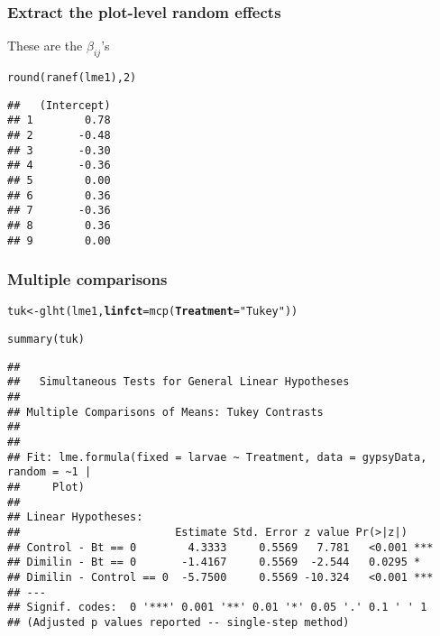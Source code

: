 \documentclass[color=usenames,dvipsnames]{beamer}\usepackage[]{graphicx}\usepackage[]{color}
\makeatletter
\newcommand{\hlnum}[1]{\textcolor[rgb]{0.69,0.494,0}{#1}}%
\newcommand{\hlstr}[1]{\textcolor[rgb]{0.749,0.012,0.012}{#1}}%
\newcommand{\hlstd}[1]{\textcolor[rgb]{0,0,0}{#1}}%
\newcommand{\hlkwb}[1]{\textcolor[rgb]{0,0.341,0.682}{#1}}%
\newcommand{\hlkwc}[1]{\textcolor[rgb]{0,0,0}{\textbf{#1}}}%
\newcommand{\hlkwd}[1]{\textcolor[rgb]{0.004,0.004,0.506}{#1}}%
\newenvironment{kframe}{%
 \def\at@end@of@kframe{}%
 \ifinner\ifhmode%
  \def\at@end@of@kframe{\end{minipage}}%
  \begin{minipage}{\columnwidth}%
 \fi\fi%
 \def\FrameCommand##1{\hskip\@totalleftmargin \hskip-\fboxsep
 \colorbox{shadecolor}{##1}\hskip-\fboxsep
     \hskip-\linewidth \hskip-\@totalleftmargin \hskip\columnwidth}%
 \MakeFramed {\advance\hsize-\width
   \@totalleftmargin\z@ \linewidth\hsize
   \@setminipage}}%
 {\par\unskip\endMakeFramed%
 \at@end@of@kframe}
\newenvironment{knitrout}{}{} %
\makeatother
\begin{document}
\begin{frame}[fragile]
  \frametitle{Extract the plot-level random effects}
  These are the $\beta_{ij}$'s
\begin{knitrout}
\color{fgcolor}\begin{kframe}
\begin{alltt}
\hlkwd{round}\hlstd{(}\hlkwd{ranef}\hlstd{(lme1),} \hlnum{2}\hlstd{)}
\end{alltt}
\begin{verbatim}
##   (Intercept)
## 1        0.78
## 2       -0.48
## 3       -0.30
## 4       -0.36
## 5        0.00
## 6        0.36
## 7       -0.36
## 8        0.36
## 9        0.00
\end{verbatim}
\end{kframe}
\end{knitrout}
\end{frame}



\begin{frame}[fragile]
  \frametitle{Multiple comparisons}
\begin{knitrout}\scriptsize
{}\color{fgcolor}\begin{kframe}
\begin{alltt}
\hlstd{tuk} \hlkwb{<-} \hlkwd{glht}\hlstd{(lme1,} \hlkwc{linfct}\hlstd{=}\hlkwd{mcp}\hlstd{(}\hlkwc{Treatment}\hlstd{=}\hlstr{"Tukey"}\hlstd{))}
\end{alltt}
\end{kframe}
\end{knitrout}
\pause
\begin{knitrout}\scriptsize
{}\color{fgcolor}\begin{kframe}
\begin{alltt}
\hlkwd{summary}\hlstd{(tuk)}
\end{alltt}
\begin{verbatim}
## 
## 	 Simultaneous Tests for General Linear Hypotheses
## 
## Multiple Comparisons of Means: Tukey Contrasts
## 
## 
## Fit: lme.formula(fixed = larvae ~ Treatment, data = gypsyData, random = ~1 | 
##     Plot)
## 
## Linear Hypotheses:
##                        Estimate Std. Error z value Pr(>|z|)    
## Control - Bt == 0        4.3333     0.5569   7.781   <0.001 ***
## Dimilin - Bt == 0       -1.4167     0.5569  -2.544   0.0295 *  
## Dimilin - Control == 0  -5.7500     0.5569 -10.324   <0.001 ***
## ---
## Signif. codes:  0 '***' 0.001 '**' 0.01 '*' 0.05 '.' 0.1 ' ' 1
## (Adjusted p values reported -- single-step method)
\end{verbatim}
\end{kframe}
\end{knitrout}
\end{frame}
\end{document}
